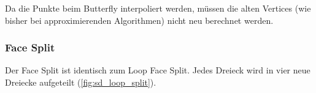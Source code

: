 Da die Punkte beim Butterfly interpoliert werden, müssen die alten Vertices
(wie bisher bei approximierenden Algorithmen) nicht neu berechnet werden. 

\subsubsection*{Face Split}
Der Face Split ist identisch zum Loop Face Split.
Jedes Dreieck wird in vier neue Dreiecke aufgeteilt (\autoref{fig:sd_loop_split}).
\cite[S. 64ff]{Standford.24.07.2015} \cite[S. 72ff]{Zorin.subdivcourse}
\cite{Seeger01asub-atomic}
\cite{Gamasutra}
\cite{Sharp}
\cite{Zorin:1996:ISM:237170.237254}